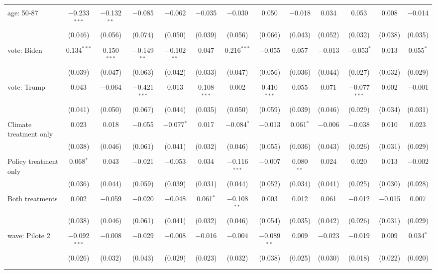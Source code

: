 \begin{tabular}{@{\extracolsep{5pt}}lcccccccccccc}
  & & & & & & & & & & & & \\ 
 age: 50-87 & $-$0.233$^{***}$ & $-$0.132$^{**}$ & $-$0.085 & $-$0.062 & $-$0.035 & $-$0.030 & 0.050 & $-$0.018 & 0.034 & 0.053 & 0.008 & $-$0.014 \\ 
  & (0.046) & (0.056) & (0.074) & (0.050) & (0.039) & (0.056) & (0.066) & (0.043) & (0.052) & (0.032) & (0.038) & (0.035) \\ 
  & & & & & & & & & & & & \\ 
 vote: Biden & 0.134$^{***}$ & 0.150$^{***}$ & $-$0.149$^{**}$ & $-$0.102$^{**}$ & 0.047 & 0.216$^{***}$ & $-$0.055 & 0.057 & $-$0.013 & $-$0.053$^{*}$ & 0.013 & 0.055$^{*}$ \\ 
  & (0.039) & (0.047) & (0.063) & (0.042) & (0.033) & (0.047) & (0.056) & (0.036) & (0.044) & (0.027) & (0.032) & (0.029) \\ 
  & & & & & & & & & & & & \\ 
 vote: Trump & 0.043 & $-$0.064 & $-$0.421$^{***}$ & 0.013 & 0.108$^{***}$ & 0.002 & 0.410$^{***}$ & 0.055 & 0.071 & $-$0.077$^{***}$ & 0.002 & $-$0.001 \\ 
  & (0.041) & (0.050) & (0.067) & (0.044) & (0.035) & (0.050) & (0.059) & (0.039) & (0.046) & (0.029) & (0.034) & (0.031) \\ 
  & & & & & & & & & & & & \\ 
 Climate treatment only & 0.023 & 0.018 & $-$0.055 & $-$0.077$^{*}$ & 0.017 & $-$0.084$^{*}$ & $-$0.013 & 0.061$^{*}$ & $-$0.006 & $-$0.038 & 0.010 & 0.023 \\ 
  & (0.038) & (0.046) & (0.061) & (0.041) & (0.032) & (0.046) & (0.055) & (0.036) & (0.043) & (0.026) & (0.031) & (0.029) \\ 
  & & & & & & & & & & & & \\ 
 Policy treatment only & 0.068$^{*}$ & 0.043 & $-$0.021 & $-$0.053 & 0.034 & $-$0.116$^{***}$ & $-$0.007 & 0.080$^{**}$ & 0.024 & 0.020 & 0.013 & $-$0.002 \\ 
  & (0.036) & (0.044) & (0.059) & (0.039) & (0.031) & (0.044) & (0.052) & (0.034) & (0.041) & (0.025) & (0.030) & (0.028) \\ 
  & & & & & & & & & & & & \\ 
 Both treatments & 0.002 & $-$0.059 & $-$0.020 & $-$0.048 & 0.061$^{*}$ & $-$0.108$^{**}$ & 0.003 & 0.012 & 0.061 & $-$0.012 & $-$0.015 & 0.007 \\ 
  & (0.038) & (0.046) & (0.061) & (0.041) & (0.032) & (0.046) & (0.054) & (0.035) & (0.042) & (0.026) & (0.031) & (0.029) \\ 
  & & & & & & & & & & & & \\ 
 wave: Pilote 2 & $-$0.092$^{***}$ & $-$0.008 & $-$0.029 & $-$0.008 & $-$0.016 & $-$0.004 & $-$0.089$^{**}$ & 0.009 & $-$0.023 & $-$0.019 & 0.009 & 0.034$^{*}$ \\ 
  & (0.026) & (0.032) & (0.043) & (0.029) & (0.023) & (0.032) & (0.038) & (0.025) & (0.030) & (0.018) & (0.022) & (0.020) \\ 
  & & & & & & & & & & & & \\ 
\hline \\[-1.8ex] 


\end{tabular}
